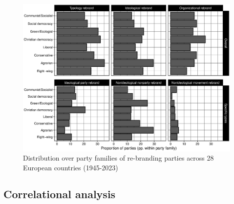 \documentclass[12pt]{article}
\newcommand{\pathtables}{./tables/}
\begin{document}
\clearpage

\begin{figure}[H]
\includegraphics[width=\textwidth]{./Figures/re_branding_families.eps}
\caption{Distribution over party families of re-branding parties across 28 European countries (1945-2023)}
\label{Fig:re_branding_families}
\end{figure}

\clearpage

\subsection{Correlational analysis}



\clearpage
\end{document}
